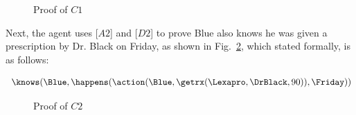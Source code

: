\begin{figure}[h!] 
\vspace{6pt}
\centering
{}
\caption{Proof of $C1$}
\label{fig:proof_of_c1}
\end{figure}

\noindent Next, the agent uses [$A2$] and [$D2$] to prove Blue also knows he was given a prescription by Dr. Black on Friday, as shown in Fig.~\ref{fig:proof_of_c2}, which stated formally, is as follows:
\begin{footnotesize}
\begin{align*}
[C2] \ \knows(\Blue,\happens(\action(\Blue,\getrx(\Lexapro,\DrBlack,90)),\Friday))
\end{align*}
\end{footnotesize}

\begin{figure}[h!] 
\vspace{6pt}
\centering
{}
\caption{Proof of $C2$}
\label{fig:proof_of_c2}
\end{figure}

